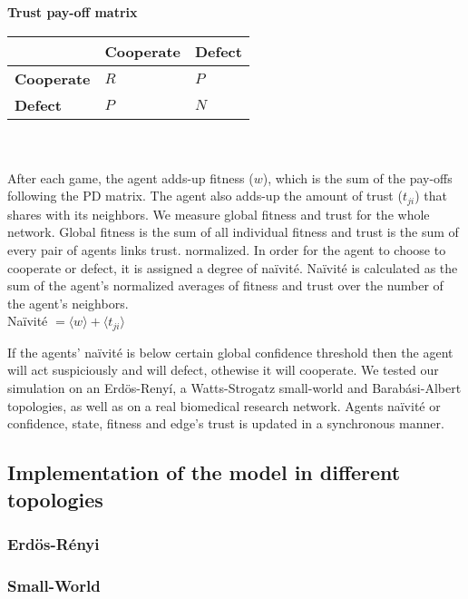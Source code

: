 {\bf Trust pay-off matrix}\\

\begin{tabular}{| l | l | l |}
\hline
          & \bf{Cooperate} & \bf{Defect} \\ \hline
\bf{Cooperate} &  $R$      &  $P$   \\ \hline
\bf{Defect}    &  $P$      &  $N$   \\ \hline

\end{tabular}\\ \\


After each game, the agent adds-up fitness ($w$), which is the sum of the
pay-offs following the PD matrix. The agent also adds-up the amount of
trust ($t_{ji}$) that shares with its neighbors. We measure global
fitness and trust for the whole network. Global fitness is the sum of
all individual fitness and trust is the sum of every pair of agents
links trust. normalized. In order for the agent to choose to cooperate
or defect, it is assigned a degree of na\"{i}vit\'e. Na\"{i}vit\'e is
calculated as the sum of the agent's normalized averages of fitness
and trust over the number of the agent's neighbors.\\


Na\"{i}vit\'e $= \langle w \rangle +  \langle t_{ji} \rangle$

If the agents' na\"{i}vit\'e is below certain global confidence threshold then
the agent will act suspiciously and will defect, othewise it will
cooperate. We tested our simulation on an Erd\"{o}s-Reny\'i, a
Watts-Strogatz small-world and Barab\'asi-Albert topologies, as well
as on a real biomedical research network. Agents na\"{i}vit\'e or
confidence, state, fitness and edge's trust is updated in a
synchronous manner.   

\subsection{Implementation of the model in different topologies}

\subsubsection{Erd\"{o}s-R\'enyi}

\subsubsection{Small-World}

